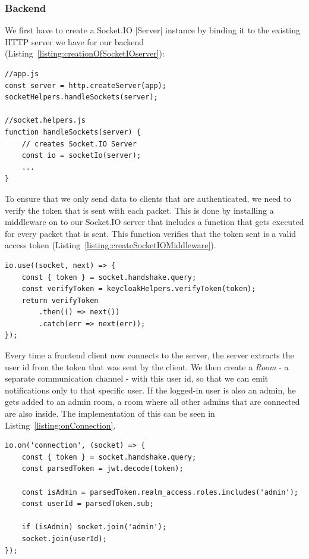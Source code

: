 \subsubsection{Backend}
\label{Backend}

We first have to create a Socket.IO |Server|\cite{socketio:server} instance by binding it to the existing HTTP server we have for our backend (Listing~\ref{listing:creationOfSocketIOserver}):

\begin{lstlisting}[label={listing:creationOfSocketIOserver},caption={Creation of Socket.IO server}]
//app.js
const server = http.createServer(app);
socketHelpers.handleSockets(server);

//socket.helpers.js
function handleSockets(server) {
    // creates Socket.IO Server
    const io = socketIo(server);
    ...
}
\end{lstlisting}

To ensure that we only send data to clients that are authenticated, we need to verify the token that is sent with each packet. This is done by installing a middleware on to our Socket.IO server that includes a function that gets executed for every packet that is sent. This function verifies that the token sent is a valid access token (Listing~\ref{listing:createSocketIOMiddleware}).

\begin{lstlisting}[label={listing:createSocketIOMiddleware},caption={Middleware of Socket.IO server}]
io.use((socket, next) => {
    const { token } = socket.handshake.query;
    const verifyToken = keycloakHelpers.verifyToken(token);
    return verifyToken
        .then(() => next())
        .catch(err => next(err));
});
\end{lstlisting}

Every time a frontend client now connects to the server, the server extracts the user id from the token that was sent by the client. We then create a \emph{Room}\cite{socketio:rooms} - a separate communication channel - with this user id, so that we can emit notifications only to that specific user. If the logged-in user is also an admin, he gets added to an admin room, a room where all other admins that are connected are also inside. The implementation of this can be seen in Listing~\ref{listing:onConnection}.

\begin{lstlisting}[label={listing:onConnection},caption={Handling client connections to Socket.IO server}]
io.on('connection', (socket) => {
    const { token } = socket.handshake.query;
    const parsedToken = jwt.decode(token);

    const isAdmin = parsedToken.realm_access.roles.includes('admin');
    const userId = parsedToken.sub;

    if (isAdmin) socket.join('admin');
    socket.join(userId);
});
\end{lstlisting}

